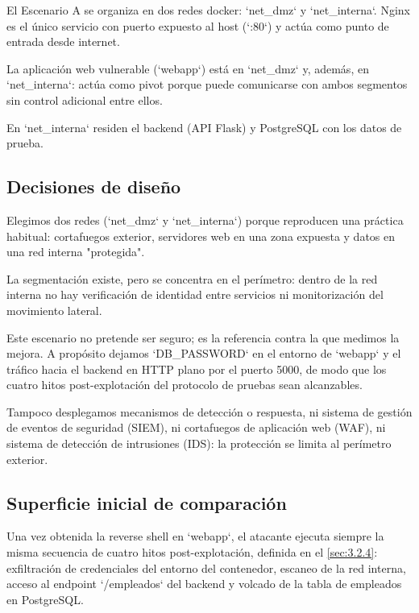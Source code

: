 \documentclass[11pt,spanish,listoffigures,listoftables]{tfgetsinf}
\begin{document}
        El Escenario A se organiza en dos redes docker: `net\_dmz` y `net\_interna`. Nginx es el único servicio con puerto expuesto al host (`:80`) y actúa como punto de entrada desde internet.
        
        La aplicación web vulnerable (`webapp`) está en `net\_dmz` y, además, en `net\_interna`: actúa como pivot porque puede comunicarse con ambos segmentos sin control adicional entre ellos. 
        
        En `net\_interna` residen el backend (API Flask) y PostgreSQL con los datos de prueba.
        
        \subsection{Decisiones de diseño}
        Elegimos dos redes (`net\_dmz` y `net\_interna`) porque reproducen una práctica habitual: cortafuegos exterior, servidores web en una zona expuesta y datos en una red interna "protegida".
        
        La segmentación existe, pero se concentra en el perímetro: dentro de la red interna no hay verificación de identidad entre servicios ni monitorización del movimiento lateral.
        
        Este escenario no pretende ser seguro; es la referencia contra la que medimos la mejora. A propósito dejamos `DB\_PASSWORD` en el entorno de `webapp` y el tráfico hacia el backend en HTTP plano por el puerto 5000, de modo que los cuatro hitos post-explotación del protocolo de pruebas sean alcanzables. 
        
        Tampoco desplegamos mecanismos de detección o respuesta, ni sistema de gestión de eventos de seguridad (SIEM), ni cortafuegos de aplicación web (WAF), ni sistema de detección de intrusiones (IDS): la protección se limita al perímetro exterior.
        
        \subsection{Superficie inicial de comparación}
        \label{sec:4.2.3}

        Una vez obtenida la reverse shell en `webapp`, el atacante ejecuta siempre la misma secuencia de cuatro hitos post-explotación, definida en el \cref{sec:3.2.4}: exfiltración de credenciales del entorno del contenedor, escaneo de la red interna, acceso al endpoint `/empleados` del backend y volcado de la tabla de empleados en PostgreSQL.
        
\end{document}
